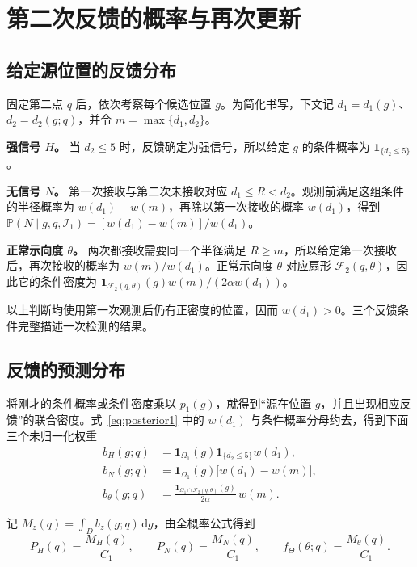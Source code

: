 \documentclass[UTF8,a4paper,zihao=-4,fontset=none]{ctexart}
\numberwithin{equation}{section}
\newcommand{\ind}{\mathbf 1}
\newcommand{\dd}{\,\mathrm d}
\newcommand{\Prob}{\mathbb P}
\begin{document}
\section{第二次反馈的概率与再次更新}
\subsection{给定源位置的反馈分布}
固定第二点 \(q\) 后，依次考察每个候选位置 \(g\)。为简化书写，下文记 \(d_1=d_1(g)\)、\(d_2=d_2(g;q)\)，并令 \(m=\max\{d_1,d_2\}\)。

\textbf{强信号 \(H\)。} 当 \(d_2\le5\) 时，反馈确定为强信号，所以给定 \(g\) 的条件概率为 \(\ind_{\{d_2\le5\}}\)。

\textbf{无信号 \(N\)。} 第一次接收与第二次未接收对应 \(d_1\le R<d_2\)。观测前满足这组条件的半径概率为 \(w(d_1)-w(m)\)，再除以第一次接收的概率 \(w(d_1)\)，得到 \(\Prob(N\mid g,q,\mathcal I_1)=[w(d_1)-w(m)]/w(d_1)\)。

\textbf{正常示向度 \(\theta\)。} 两次都接收需要同一个半径满足 \(R\ge m\)，所以给定第一次接收后，再次接收的概率为 \(w(m)/w(d_1)\)。正常示向度 \(\theta\) 对应扇形 \(\mathcal F_2(q,\theta)\)，因此它的条件密度为 \(\ind_{\mathcal F_2(q,\theta)}(g)w(m)/(2\alpha w(d_1))\)。

以上判断均使用第一次观测后仍有正密度的位置，因而 \(w(d_1)>0\)。三个反馈条件完整描述一次检测的结果。

\subsection{反馈的预测分布}
将刚才的条件概率或条件密度乘以 \(p_1(g)\)，就得到“源在位置 \(g\)，并且出现相应反馈”的联合密度。式~\eqref{eq:posterior1} 中的 \(w(d_1)\) 与条件概率分母约去，得到下面三个未归一化权重
\begin{equation}\label{eq:weights}
\begin{aligned}
b_H(g;q)&=\ind_{\Omega_1}(g)\ind_{\{d_2\le5\}}w(d_1),\\
b_N(g;q)&=\ind_{\Omega_1}(g)\bigl[w(d_1)-w(m)\bigr],\\
b_\theta(g;q)&=\frac{\ind_{\Omega_1\cap\mathcal F_2(q,\theta)}(g)}{2\alpha}\,w(m).
\end{aligned}
\end{equation}

记 \(M_z(q)=\int_D b_z(g;q)\dd g\)，由全概率公式得到
\begin{equation}\label{eq:feedbackprob}
P_H(q)=\frac{M_H(q)}{C_1},\qquad
P_N(q)=\frac{M_N(q)}{C_1},\qquad
f_\Theta(\theta;q)=\frac{M_\theta(q)}{C_1}.
\end{equation}
\end{document}
